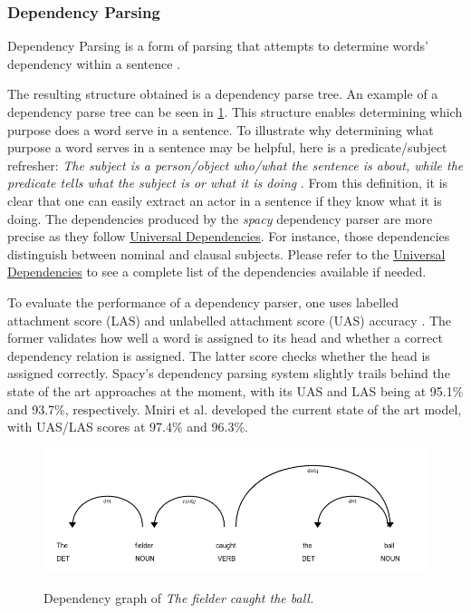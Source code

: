 \subsubsection{Dependency Parsing}

Dependency Parsing is a form of parsing that attempts to determine words' dependency within a sentence \cite{RefWorks:RefID:28-jurafsky2014speech}.

The resulting structure obtained is a dependency parse tree.
An example of a dependency parse tree can be seen in \ref{dependency-graph}.
This structure enables determining which purpose does a word serve in a sentence.
To illustrate why determining what purpose a word serves in a sentence may be helpful, here is a predicate/subject refresher:
\emph{The subject is a person/object who/what the sentence is about, while the predicate tells what the subject is or what it is doing} \cite{RefWorks:RefID:27-subject}.
From this definition, it is clear that one can easily extract an actor in a sentence if they know what it is doing.
The dependencies produced by the \emph{spacy} dependency parser are more precise as they follow \hyperlink{https://univesaldependencies.org}{Universal Dependencies}.
For instance, those dependencies distinguish between nominal and clausal subjects.
Please refer to the \hyperlink{https://univesaldependencies.org}{Universal Dependencies} to see a complete list of the dependencies available if needed. 


To evaluate the performance of a dependency parser, one uses labelled attachment score (LAS) and unlabelled attachment score (UAS) accuracy \cite{RefWorks:RefID:28-jurafsky2014speech}.
The former validates how well a word is assigned to its head and whether a correct dependency relation is assigned.
The latter score checks whether the head is assigned correctly.
Spacy's dependency parsing system slightly trails behind the state of the art approaches at the moment, with its UAS and LAS being at 95.1\% and 93.7\%, respectively. 
Mniri et al. \cite{RefWorks:RefID:29-mrini2019rethinking} developed the current state of the art model, with UAS/LAS scores at 97.4\% and 96.3\%.

\begin{figure}[h]
\caption{Dependency graph of \emph{The fielder caught the ball.}}
\centering
\includegraphics[width=\textwidth]{background/dependency_graph.png}
\label{dependency-graph}
\end{figure}

